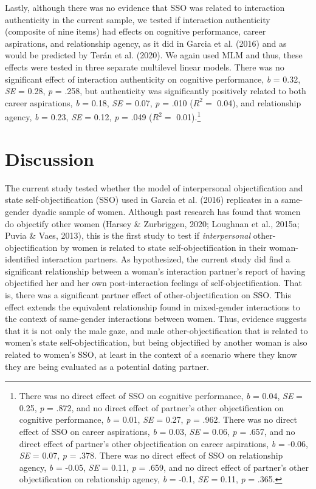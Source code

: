 \documentclass[man]{apa6}
\let\rmarkdownfootnote\footnote%
\def\footnote{\protect\rmarkdownfootnote}
\begin{document}
Lastly, although there was no evidence that SSO was related to
interaction authenticity in the current sample, we tested if interaction
authenticity (composite of nine items) had effects on cognitive
performance, career aspirations, and relationship agency, as it did in
Garcia et al. (2016) and as would be predicted by Terán et al. (2020).
We again used MLM and thus, these effects were tested in three separate
multilevel linear models. There was no significant effect of interaction
authenticity on cognitive performance, \emph{b} = 0.32, \emph{SE} =
0.28, \emph{p} = .258, but authenticity was significantly positively
related to both career aspirations, \emph{b} = 0.18, \emph{SE} = 0.07,
\emph{p} = .010 (\(R^2 =\) 0.04), and relationship agency, \emph{b} =
0.23, \emph{SE} = 0.12, \emph{p} = .049 (\(R^2 =\) 0.01).\footnote{There
  was no direct effect of SSO on cognitive performance, \emph{b} = 0.04,
  \emph{SE} = 0.25, \emph{p} = .872, and no direct effect of partner's
  other objectification on cognitive performance, \emph{b} = 0.01,
  \emph{SE} = 0.27, \emph{p} = .962. There was no direct effect of SSO
  on career aspirations, \emph{b} = 0.03, \emph{SE} = 0.06, \emph{p} =
  .657, and no direct effect of partner's other objectification on
  career aspirations, \emph{b} = -0.06, \emph{SE} = 0.07, \emph{p} =
  .378. There was no direct effect of SSO on relationship agency,
  \emph{b} = -0.05, \emph{SE} = 0.11, \emph{p} = .659, and no direct
  effect of partner's other objectification on relationship agency,
  \emph{b} = -0.1, \emph{SE} = 0.11, \emph{p} = .365.}

\section{Discussion}\label{discussion}

The current study tested whether the model of interpersonal
objectification and state self-objectification (SSO) used in Garcia et
al. (2016) replicates in a same-gender dyadic sample of women. Although
past research has found that women do objectify other women (Harsey \&
Zurbriggen, 2020; Loughnan et al., 2015a; Puvia \& Vaes, 2013), this is
the first study to test if \emph{interpersonal} other-objectification by
women is related to state self-objectification in their woman-identified
interaction partners. As hypothesized, the current study did find a
significant relationship between a woman's interaction partner's report
of having objectified her and her own post-interaction feelings of
self-objectification. That is, there was a significant partner effect of
other-objectification on SSO. This effect extends the equivalent
relationship found in mixed-gender interactions to the context of
same-gender interactions between women. Thus, evidence suggests that it
is not only the male gaze, and male other-objectification that is
related to women's state self-objectification, but being objectified by
another woman is also related to women's SSO, at least in the context of
a scenario where they know they are being evaluated as a potential
dating partner.
\end{document}

